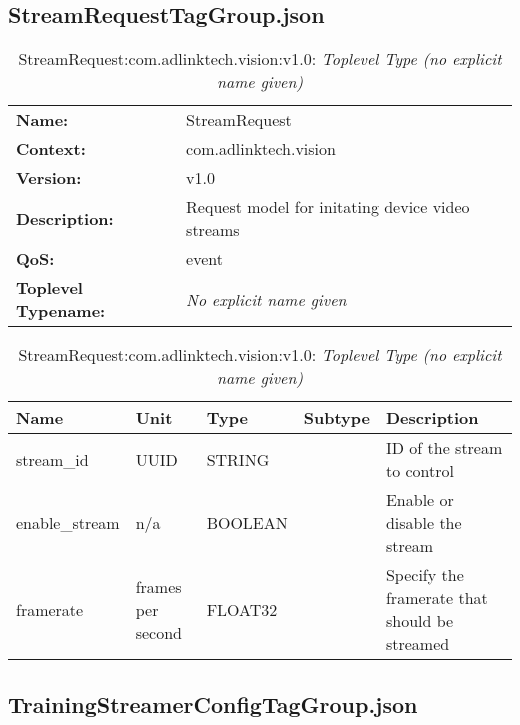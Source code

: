 \begin{table}[H]
\end{table}

\subsection{StreamRequestTagGroup.json}

\begin{table}[H]
\begin{tabularx}{\textwidth}{l X} 
       \textbf{Name:} & StreamRequest \\ 
	   \textbf{Context:} & com.adlinktech.vision \\ 
	   \textbf{Version:} & v1.0 \\ 
	   \textbf{Description:} & Request model for initating device video streams \\ 
	   \textbf{QoS:} & event \\
	   \textbf{Toplevel Typename:} & \textit{No explicit name given} \\ 
\end{tabularx}
\caption{StreamRequest:com.adlinktech.vision:v1.0}\label{StreamRequestTagGroup.json:table:StreamRequest}
\bigskip
\begin{tabularx}{\textwidth}{l l l l X} 
	 \textbf{Name} & \textbf{Unit} & \textbf{Type} & \textbf{Subtype} & \textbf{Description} \\
	 \midrule
   stream\_id & UUID & STRING &  & ID of the stream to control \\
   enable\_stream & n/a & BOOLEAN &  & Enable or disable the stream \\
   framerate & frames per second & FLOAT32 &  & Specify the framerate that should be streamed \\
\end{tabularx}
\caption{StreamRequest:com.adlinktech.vision:v1.0: \textit{Toplevel Type (no explicit name given)}}\label{StreamRequestTagGroup.json:table:StreamRequest-no-type-given}


\end{table}

\subsection{TrainingStreamerConfigTagGroup.json}

